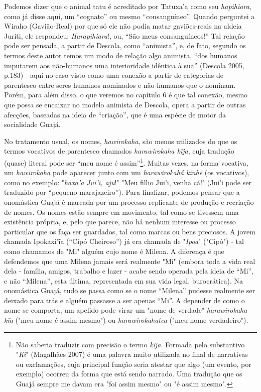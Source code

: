 Podemos dizer que o animal tatu é acreditado por Tatuxa'a como seu
\emph{hapihiara}, como já disse aqui, um ``cognato'' ou mesmo
``consanguíneo''. Quando perguntei a Wiraho (Gavião-Real) por que só ele
não podia matar gaviões-reais na aldeia Juriti, ele respondeu:
\emph{Harapihiara}!, ou, ``São meus consanguíneos!'' Tal relação pode
ser pensada, a partir de Descola, como ``animista'', e, de fato, segundo
os termos deste autor temos um modo de relação algo animista, ``dos
humanos imputarem aos não-humanos uma interioridade idêntica à sua''
(Descola 2005, p.183) - aqui no caso visto como uma conexão a partir de
categorias de parentesco entre seres humanos nominados e não-humanos que
o nominam. Porém, para além disso, o que veremos no capítulo 6 é que tal
conexão, mesmo que possa se encaixar no modelo animista de Descola,
opera a partir de outras afecções, baseadas na ideia de ``criação'', que
é uma espécie de motor da socialidade Guajá.

No tratamento usual, os nomes, \emph{hawirokaha}, são menos utilizados
do que os termos vocativos de parentesco chamados \emph{harawirokaha
kĩja}, cuja tradução (quase) literal pode ser ``meu nome é
assim''\footnote{Não saberia traduzir com precisão o termo \emph{kĩja}.
  Formada pelo substantivo "\emph{Kĩ}" (Magalhães 2007) é uma palavra
  muito utilizada no final de narrativas ou exclamações, cuja principal
  função seria atestar que algo (um evento, por exemplo) ocorreu da
  forma que está sendo narrado. Uma tradução que os Guajá sempre me
  davam era "foi assim mesmo" ou "é assim mesmo".}. Muitas vezes, na
forma vocativa, um \emph{hawirokaha} pode aparecer junto com um
\emph{harawirokahá kĩnhẽ} (os vocativos), como no exemplo: "\emph{haxa'a
Jui'i, aju}!" "Meu filho Jui'i, venha cá!" (Jui'i pode ser traduzido por
``pequeno marajazeiro''). Para finalizar, podemos pensar que a
onomástica Guajá é marcada por um processo replicante de produção e
recriação de nomes. Os nomes estão sempre em movimento, tal como se
tivessem uma existência própria, e, pelo que parece, não há nenhum
interesse ou processo particular que os faça ser guardados, tal como
marcas ou bens preciosos. A jovem chamada Ipokaxi'ĩa (``Cipó Cheiroso'')
já era chamada de "\emph{Ipoa}" ("Cipó") - tal como chamamos de "Mi"
alguém cujo nome é Milena. A diferença é que defendemos que uma Milena
jamais será realmente "Mi" (embora toda a vida real dela - família,
amigos, trabalho e lazer - acabe sendo operada pela ideia de ``Mi'', e
não ``Milena'', esta última, representada em sua vida legal,
burocrática). Na onomástica Guajá, tudo se passa como se o nome
``Milena'' pudesse realmente ser deixado para trás e alguém passasse a
ser apenas ``Mi''. A depender de como o nome se comporta, um apelido
pode virar um "nome de verdade" \emph{harawirokaha kĩa} ("meu nome é
assim mesmo") ou \emph{harawirokahatea} ("meu nome verdadeiro").

